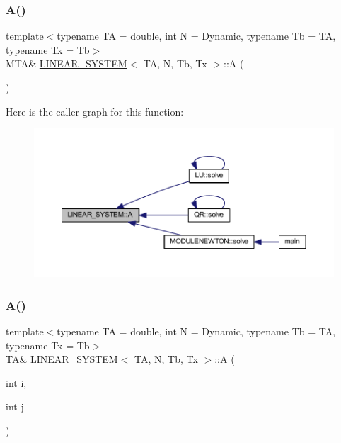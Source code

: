 \subsubsection{\texorpdfstring{A()}{A()}\hspace{0.1cm}{\footnotesize\ttfamily [1/2]}}
{\footnotesize\ttfamily template$<$typename TA = double, int N = Dynamic, typename Tb = TA, typename Tx = Tb$>$ \\
M\+TA\& \mbox{\hyperlink{class_l_i_n_e_a_r___s_y_s_t_e_m}{L\+I\+N\+E\+A\+R\+\_\+\+S\+Y\+S\+T\+EM}}$<$ TA, N, Tb, Tx $>$\+::A (\begin{DoxyParamCaption}{ }\end{DoxyParamCaption})\hspace{0.3cm}{\ttfamily [inline]}}

Here is the caller graph for this function\+:
\nopagebreak
\begin{figure}[H]
\begin{center}
\leavevmode
\includegraphics[width=350pt]{class_l_i_n_e_a_r___s_y_s_t_e_m_a307c8896bb3218768f016a2a24de3bcd_icgraph}
\end{center}
\end{figure}
\mbox{\label{class_l_i_n_e_a_r___s_y_s_t_e_m_a5163aedcb567d591f5812bd3c892fb07}} 
\subsubsection{\texorpdfstring{A()}{A()}\hspace{0.1cm}{\footnotesize\ttfamily [2/2]}}
{\footnotesize\ttfamily template$<$typename TA = double, int N = Dynamic, typename Tb = TA, typename Tx = Tb$>$ \\
TA\& \mbox{\hyperlink{class_l_i_n_e_a_r___s_y_s_t_e_m}{L\+I\+N\+E\+A\+R\+\_\+\+S\+Y\+S\+T\+EM}}$<$ TA, N, Tb, Tx $>$\+::A (\begin{DoxyParamCaption}\item[{int}]{i,  }\item[{int}]{j }\end{DoxyParamCaption})\hspace{0.3cm}{\ttfamily [inline]}}

